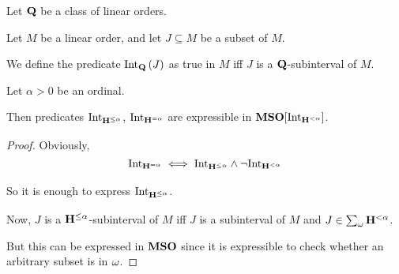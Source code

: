 
\begin{definition}
  Let $\mathbf{Q}$ be a class of linear orders.

  Let $M$ be a linear order, and let $J \subseteq M$ be a subset of $M$.

  We define the predicate $\mathrm{Int}_{\mathbf{Q}} \left( {J} \right)$ as
  true in $M$ iff $J$ is a $\mathbf{Q}$-subinterval of $M$.
\end{definition}

\begin{lemma}
  Let $\alpha > 0$ be an ordinal.

  Then predicates $\mathrm{Int}_{\mathbf{H}_{}^{\le \alpha}}$, $\mathrm{Int}_{\mathbf{H}_{}^{= \alpha}}$
  are expressible in $\mathbf{MSO}[\mathrm{Int}_{\mathbf{H}_{}^{< \alpha}}]$.
\end{lemma}

\begin{proof}
  Obviously, \[
    \mathrm{Int}_{\mathbf{H}_{}^{= \alpha}}
    \iff \mathrm{Int}_{\mathbf{H}_{}^{\le \alpha}} \wedge \neg \mathrm{Int}_{\mathbf{H}_{}^{< \alpha}}
  \]

  So it is enough to express $\mathrm{Int}_{\mathbf{H}_{}^{\le \alpha}}$.

  Now, $J$ is a $\mathbf{H}_{}^{\le \alpha}$-subinterval of $M$ iff
  $J$ is a subinterval of $M$ and $J \in \sum_{\omega}{\mathbf{H}_{}^{< \alpha}}$.

  But this can be expressed in $\mathbf{MSO}$ since it is expressible
  to check whether an arbitrary subset is in $\omega$.
\end{proof}

